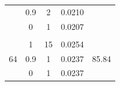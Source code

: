 \begin{table}[]
\begin{tabular}{ccccc}
\multicolumn{1}{|c|}{}                         & \multicolumn{1}{c|}{0.9}                & \multicolumn{1}{c|}{2}                                                                                    & \multicolumn{1}{c|}{0.0210}                                                             & \multicolumn{1}{c|}{}                                                                    \\ \cline{2-4}
\multicolumn{1}{|c|}{}                         & \multicolumn{1}{c|}{0}                  & \multicolumn{1}{c|}{1}                                                                                    & \multicolumn{1}{c|}{0.0207}                                                             & \multicolumn{1}{c|}{}                                                                    \\ \hline
\multicolumn{1}{l}{}                           & \multicolumn{1}{l}{}                    & \multicolumn{1}{l}{}                                                                                      & \multicolumn{1}{l}{}                                                                    & \multicolumn{1}{l}{}                                                                     \\ \hline
\multicolumn{1}{|c|}{\multirow{3}{*}{64}}      & \multicolumn{1}{c|}{1}                  & \multicolumn{1}{c|}{15}                                                                                   & \multicolumn{1}{c|}{0.0254}                                                             & \multicolumn{1}{c|}{\multirow{3}{*}{85.84}}                                              \\ \cline{2-4}
\multicolumn{1}{|c|}{}                         & \multicolumn{1}{c|}{0.9}                & \multicolumn{1}{c|}{1}                                                                                    & \multicolumn{1}{c|}{0.0237}                                                             & \multicolumn{1}{c|}{}                                                                    \\ \cline{2-4}
\multicolumn{1}{|c|}{}                         & \multicolumn{1}{c|}{0}                  & \multicolumn{1}{c|}{1}                                                                                    & \multicolumn{1}{c|}{0.0237}                                                             & \multicolumn{1}{c|}{}                                                                    \\ \hline
\end{tabular}
\end{table}

